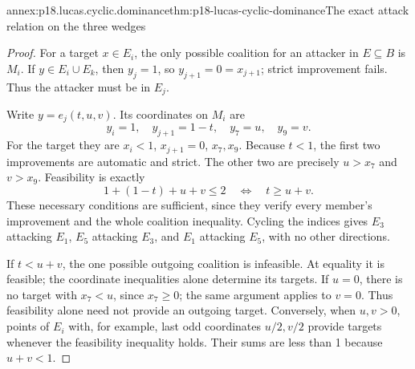 \begin{annexitem}{annex:p18.lucas.cyclic.dominance}{thm:p18-lucas-cyclic-dominance}{The exact attack relation on the three wedges}
\begin{proof}
For a target \(x\in E_i\), the only possible coalition
for an attacker in \(E\subseteq B\) is \(M_i\).
If \(y\in E_i\cup E_k\), then \(y_j=1\), so
\(y_{j+1}=0=x_{j+1}\); strict improvement fails.
Thus the attacker must be in \(E_j\).

Write \(y=e_j(t,u,v)\). Its coordinates on \(M_i\) are
\[
                 y_i=1,\quad y_{j+1}=1-t,\quad
                 y_7=u,\quad y_9=v.
\]
For the target they are \(x_i<1\), \(x_{j+1}=0\),
\(x_7,x_9\). Because \(t<1\), the first two improvements
are automatic and strict. The other two are precisely
\(u>x_7\) and \(v>x_9\). Feasibility is exactly
\[
              1+(1-t)+u+v\leq2
                       \quad\Longleftrightarrow\quad t\geq u+v.
\]
These necessary conditions are sufficient, since they
verify every member's improvement and the whole coalition
inequality. Cycling the indices gives \(E_3\) attacking
\(E_1\), \(E_5\) attacking \(E_3\), and \(E_1\) attacking
\(E_5\), with no other directions.

If \(t<u+v\), the one possible outgoing coalition is
infeasible. At equality it is feasible; the coordinate
inequalities alone determine its targets. If \(u=0\),
there is no target with \(x_7<u\), since \(x_7\geq0\);
the same argument applies to \(v=0\). Thus feasibility
alone need not provide an outgoing target. Conversely,
when \(u,v>0\), points of \(E_i\) with, for example,
last odd coordinates \(u/2,v/2\) provide targets whenever
the feasibility inequality holds. Their sums are less
than 1 because \(u+v<1\).
\end{proof}
\end{annexitem}


